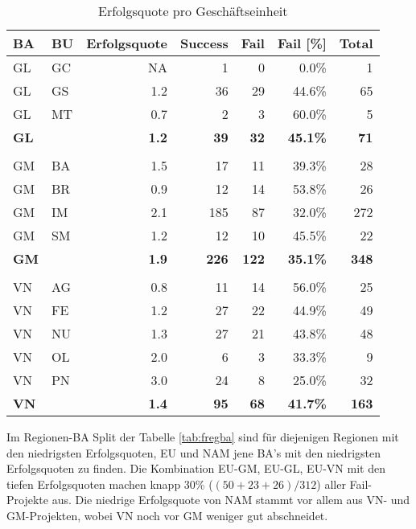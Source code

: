 \begin{table}[htpb]
	\centering
	\caption{Erfolgsquote pro Geschäftseinheit}
	\begin{tabular}{llrrrrr}
		\textbf{BA} & \textbf{BU} & \multicolumn{1}{l}{\textbf{Erfolgsquote}} & \multicolumn{1}{l}{\textbf{Success}} & \multicolumn{1}{l}{\textbf{Fail}} & \multicolumn{1}{l}{\textbf{Fail [\%]}} & \multicolumn{1}{l}{\textbf{Total}} \\\hline
		GL    & GC    & NA    & 1     & 0     & 0.0\% & 1 \\
		GL    & GS    & 1.2   & 36    & 29    & 44.6\% & 65 \\
		GL    & MT    & 0.7   & 2     & 3     & 60.0\% & 5 \\\hline
		\textbf{GL} &  & \textbf{1.2} & \textbf{39} &\textbf{32} & \textbf{45.1\%} & \textbf{71}\\
		      &       &       &       &       &        &   \\
		GM    & BA    & 1.5   & 17    & 11    & 39.3\% & 28 \\
		GM    & BR    & 0.9   & 12    & 14    & 53.8\% & 26 \\
		GM    & IM    & 2.1   & 185   & 87    & 32.0\% & 272 \\
		GM    & SM    & 1.2   & 12    & 10    & 45.5\% & 22 \\\hline
		\textbf{GM} &  & \textbf{1.9} & \textbf{226} &\textbf{122} & \textbf{35.1\%} & \textbf{348}\\
		      &       &       &       &       &        &   \\
		VN    & AG    & 0.8   & 11    & 14    & 56.0\% & 25 \\
		VN    & FE    & 1.2   & 27    & 22    & 44.9\% & 49 \\
		VN    & NU    & 1.3   & 27    & 21    & 43.8\% & 48 \\
		VN    & OL    & 2.0   & 6     & 3     & 33.3\% & 9 \\
		VN    & PN    & 3.0   & 24    & 8     & 25.0\% & 32 \\\hline
		\textbf{VN} &  & \textbf{1.4} & \textbf{95} &\textbf{68} & \textbf{41.7\%} & \textbf{163}\\
	\end{tabular}%
	\label{fbabu}%
\end{table}%
\newline Im Regionen-BA Split der Tabelle \ref{tab:fregba} sind für diejenigen Regionen mit den niedrigsten Erfolgsquoten, EU und NAM jene BA's mit den niedrigsten Erfolgsquoten zu finden. Die Kombination EU-GM, EU-GL, EU-VN mit den tiefen Erfolgsquoten machen knapp 30\% ($(50+23+26)/312$) aller Fail-Projekte aus. Die niedrige Erfolgsquote von NAM stammt vor allem aus VN- und GM-Projekten, wobei VN noch vor GM weniger gut abschneidet.
